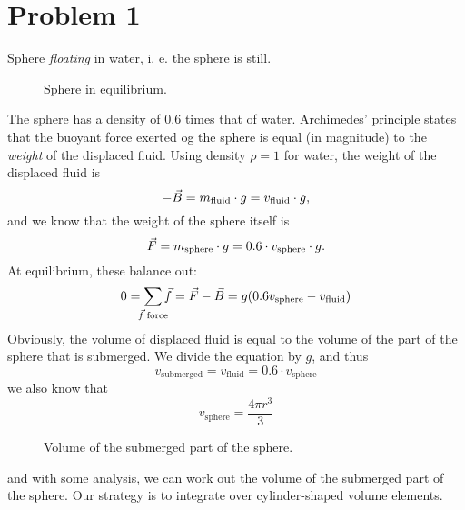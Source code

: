 \documentclass[12pt]{article}
\begin{document}
\section*{Problem 1}
Sphere {\em floating} in water, i. e. the sphere is still.
\begin{figure}[H]
\centering

\caption{
    Sphere in equilibrium.
}
\label{fig:kule}
\end{figure}
\noindent
The sphere has a density of $0.6$ times that of water.
Archimedes' principle states that the buoyant force exerted
og the sphere is equal (in magnitude) to the {\em weight} of the displaced fluid.
Using density $\rho = 1$ for water, the weight of the displaced fluid is
\[
    -\vec{B} = m_{\text{fluid}} \cdot g = v_{\text{fluid}} \cdot g \text,
\]
and we know that the weight of the sphere itself is
\[
    \vec{F} = m_{\text{sphere}} \cdot g = 0.6 \cdot v_{\text{sphere}} \cdot g \text.
\]
At equilibrium, these balance out:
\[
    0 = \sum_{\mathclap{\vec f \; \text{force}}} \vec{f} = \vec F - \vec B
        = g(0.6v_\text{sphere} - v_\text{fluid})
\]
Obviously, the volume of displaced fluid is equal to the volume of the
part of the sphere that is submerged.
We divide the equation by $g$, and thus
\begin{equation}
    v_\text{submerged} = v_\text{fluid} = 0.6 \cdot v_\text{sphere}
\end{equation}
we also know that
\begin{equation}
    v_\text{sphere} = \frac{4\pi r^3}{3}
\end{equation}
\begin{figure}[H]
\centering

\caption{
    Volume of the submerged part of the sphere.
}
\label{fig:sub}
\end{figure}
\noindent
and with some analysis, we can work out the volume of the submerged
part of the sphere. Our strategy is to integrate over
cylinder-shaped volume elements.
\end{document}
